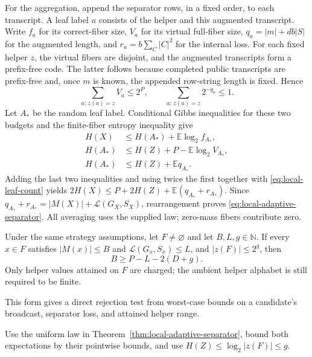 \begin{proofoutline}
For the aggregation, append the separator rows, in a fixed order, to each
transcript.  A leaf label $a$ consists of the helper and this augmented
transcript.  Write $f_a$ for its correct-fiber size, $V_a$ for its virtual
full-fiber size, $q_a=|m|+db|S|$ for the augmented length, and
$r_a=b\sum_C|C|^2$ for the internal loss.  For each fixed helper $z$, the
virtual fibers are disjoint, and the augmented transcripts form a prefix-free
code.  The latter follows because completed public transcripts are
prefix-free and, once $m$ is known, the appended row-string length is fixed.
Hence
\[
  \sum_{a:\,z(a)=z} V_a\le 2^P,
  \qquad
  \sum_{a:\,z(a)=z}2^{-q_a}\le 1.
\]
Let $A_*$ be the random leaf label.  Conditional Gibbs inequalities for these
two budgets and the finite-fiber entropy inequality give
\begin{align*}
 H(X)&\le H(A_*)+\mathbb E\log_2 f_{A_*},\\
 H(A_*)&\le H(Z)+P-\mathbb E\log_2 V_{A_*},\\
 H(A_*)&\le H(Z)+\mathbb E q_{A_*}.
\end{align*}
Adding the last two inequalities and using twice the first together with
\eqref{eq:local-leaf-count} yields
$2H(X)\le P+2H(Z)+\mathbb E(q_{A_*}+r_{A_*})$.
Since $q_{A_*}+r_{A_*}=|M(X)|+\mathcal L(G_X,S_X)$, rearrangement proves
\eqref{eq:local-adaptive-separator}.  All averaging uses the supplied law;
zero-mass fibers contribute zero.
\end{proofoutline}

\begin{corollary}\label{cor:local-separator-worst}
Under the same strategy assumptions, let $F\ne\varnothing$ and let
$B,L,g\in\mathbb N$.  If every $x\in F$ satisfies
$|M(x)|\le B$ and $\mathcal L(G_x,S_x)\le L$, and
$|z(F)|\le 2^g$, then
\[
  B\ge P-L-2(D+g).
\]
Only helper values attained on $F$ are charged; the ambient helper alphabet
is still required to be finite.
\end{corollary}
This form gives a direct rejection test from worst-case bounds on a candidate's
broadcast, separator loss, and attained helper range.
\begin{proofoutline}
Use the uniform law in Theorem~\ref{thm:local-adaptive-separator}, bound both
expectations by their pointwise bounds, and use $H(Z)\le\log_2|z(F)|\le g$.
\end{proofoutline}

